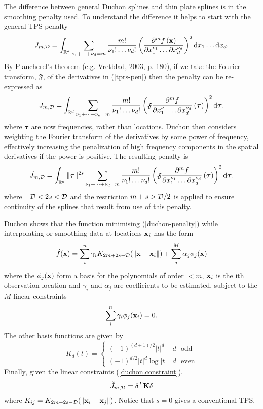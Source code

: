 \documentclass[useAMS, referee]{biom}
\newcommand{\beq}{\begin{equation}}
\newcommand{\eeq}{\end{equation}}
\newcommand{\ts}{^T}
\begin{document}
The difference between general Duchon splines and thin plate splines is in the smoothing penalty used. To understand the difference it helps to start with the general TPS penalty
\begin{equation}
J_{m,{\cal D}} = \int_{\mathbb{R}^d} \sum_{\nu_1 + \dots + \nu_d=m} \frac{m!}{\nu_1! \dots \nu_d!} \left( \frac{\partial^m f \left (\mathbf{x} \right )}{\partial x_1^{\nu_1} \ldots  \partial x_d^{\nu_d}} \right)^2 \text{d} x_1 \ldots  \text{d} x_d.
\label{tprs-pen}
\end{equation}
By Plancherel's theorem (e.g. Vretblad, 2003, p. 180), if we take the Fourier transform, $\mathfrak{F}$, of the derivatives in (\ref{tprs-pen}) then the penalty can be re-expressed as
\begin{equation}
J_{m,{\cal D}} =  \int_{\mathbb{R}^d} \sum_{\nu_1 + \dots + \nu_d=m} \frac{m!}{\nu_1! \dots \nu_d!} \left ( \mathfrak{F} \frac{\partial^m f}{\partial x_1^{\nu_1} \ldots  \partial x_d^{\nu_d}} \left (  \boldsymbol{\tau}\right ) \right )^2 \text{d} \boldsymbol{\tau}.
\label{tprs-pen-ft}
\end{equation}
where $\bm \tau$ are now frequencies, rather than locations. Duchon then considers weighting the Fourier transform of the derivatives by some power of frequency, effectively increasing the penalization of high frequency components in the spatial derivatives if the power is positive. The resulting penalty is 
\begin{equation}
\breve{J}_{m,{\cal D}} = \int_{\mathbb{R}^d} \| \boldsymbol{\tau} \|^{2s} \sum_{\nu_1 + \dots + \nu_d=m} \frac{m!}{\nu_1! \dots \nu_d!}\left ( \mathfrak{F} \frac{\partial^m f}{\partial x_1^{\nu_1} \ldots  \partial x_d^{\nu_d}} \left (\boldsymbol{\tau} \right ) \right )^2 \text{d} \boldsymbol{\tau}.
\label{duchon-penalty}
\end{equation}
where $-{\cal D} < 2s < {\cal D}$ and the restriction $m + s > {\cal D}/2$ is applied to ensure continuity of the splines that result from use of this penalty. 

Duchon shows that the function minimising (\ref{duchon-penalty}) while interpolating or smoothing data at locations ${\bf x}_i$ has the form 
$$
\hat f({\bf x}) = \sum_i^n \gamma_i K_{2m+2s-{\cal D}}(\|{\bf x}-{\bf x}_i\|) + \sum_j^M \alpha_j \phi_j({\bf x})
$$
where the $\phi_j({\bf x})$ form a basis for the polynomials of order $<m$, ${\bf x}_i$ is the ith observation location and $\gamma_i$ and $\alpha_j$ are coefficients to be estimated, subject to the $M$ linear constraints
\beq
\sum_i^n \gamma_i \phi_j({\bf x}_i)=0.
\label{duchon.constraint}
\eeq
The other basis functions are given by
$$
K_d(t) = \left \{ \begin{array}{ll}
(-1)^{(d+1)/2}|t|^d & d \text{~~odd}\\
(-1)^{d/2}|t|^d\log |t| & d \text{~~even}
\end{array} \right .
$$
Finally, given the linear constraints (\ref{duchon.constraint}),
$$
\breve{J}_{m,{\cal D}} = {\bf \delta} \ts {\bf K} {\bf \delta}
$$
where $K_{ij} = K_{2m+2s-{\cal D}}(\|{\bf x}_i-{\bf x}_j\|)$. Notice that $s=0$ gives a conventional TPS.
\end{document}
